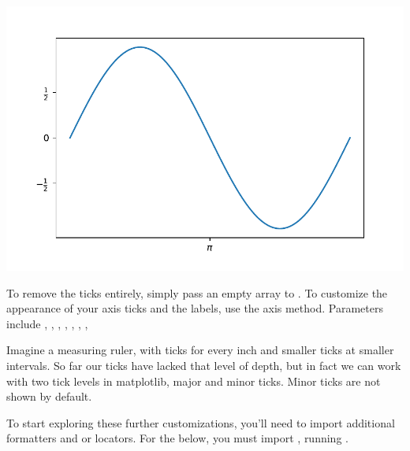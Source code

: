 
\begin{center}
    \includegraphics[width = .75\textwidth]{figures/proseplots/ticks1.pdf}
\end{center}

To remove the ticks entirely, simply pass an empty array to . To customize the appearance of your axis ticks and the labels, use the  axis method. Parameters include , , , , , , , 

Imagine a measuring ruler, with ticks for every inch and smaller ticks at smaller intervals. So far our ticks have lacked that level of depth, but in fact we can work with two tick levels in matplotlib, major and minor ticks. Minor ticks are not shown by default. 

To start exploring these further customizations, you'll need to import additional formatters and or locators. For the below, you must import , running .


